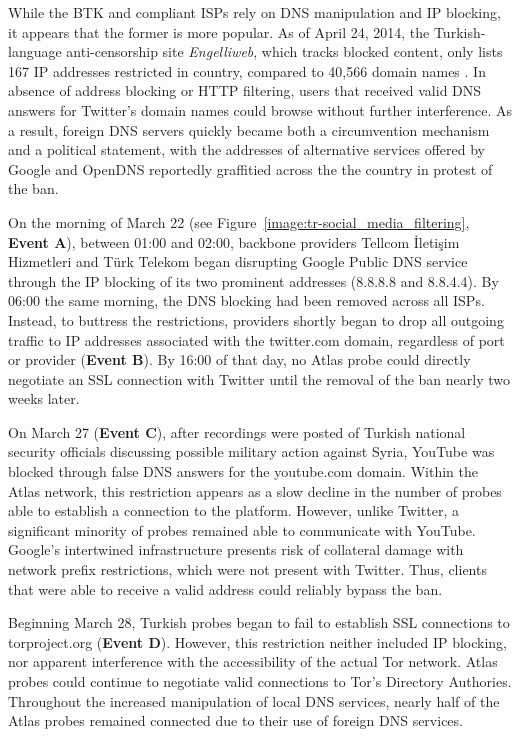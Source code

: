While the BTK and compliant ISPs rely on DNS manipulation and IP
blocking, it appears that the former is more popular.  As of April 24,
2014, the Turkish-language anti-censorship site \textit{Engelliweb},
which tracks blocked content, only lists 167 IP addresses restricted in
country, compared to 40,566 domain names \cite{engelliweb}. In absence
of address blocking or HTTP filtering, users that received valid DNS
answers for Twitter's domain names could browse without further
interference. As a result, foreign DNS servers quickly became both a
circumvention mechanism and a political statement, with the addresses of
alternative services offered by Google and OpenDNS reportedly graffitied
across the the country in protest of the ban.

On the morning of March 22 (see
Figure~\ref{image:tr-social_media_filtering}, \textbf{Event A}), between
01:00 and 02:00, backbone providers Tellcom \.{I}leti\c{s}im Hizmetleri
and T\"{u}rk Telekom began disrupting Google Public DNS service through
the IP blocking of its two prominent addresses (8.8.8.8 and 8.8.4.4). By
06:00 the same morning, the DNS blocking had been removed across all
ISPs. Instead, to buttress the restrictions, providers shortly began to
drop all outgoing traffic to IP addresses associated with the twitter.com
domain, regardless of port or provider (\textbf{Event B}). By 16:00 of
that day, no Atlas probe could directly negotiate an SSL connection with
Twitter until the removal of the ban nearly two weeks later.

On March 27 (\textbf{Event C}), after recordings were posted of Turkish
national security officials discussing possible military action against
Syria, YouTube was blocked through false DNS answers for the youtube.com
domain. Within the Atlas network, this restriction appears as a slow
decline in the number of probes able to establish a connection to the
platform. However, unlike Twitter, a significant minority of probes
remained able to communicate with YouTube. Google's intertwined
infrastructure presents risk of collateral damage with network prefix
restrictions, which were not present with Twitter. Thus, clients that
were able to receive a valid address could reliably bypass the ban.

Beginning March 28, Turkish probes began to fail to establish SSL
connections to torproject.org (\textbf{Event D}). However, this
restriction neither included IP blocking, nor apparent interference with
the accessibility of the actual Tor network. Atlas probes could continue
to negotiate valid connections to Tor's Directory Authories. Throughout
the increased manipulation of local DNS services, nearly half of the
Atlas probes remained connected due to their use of foreign DNS services.

